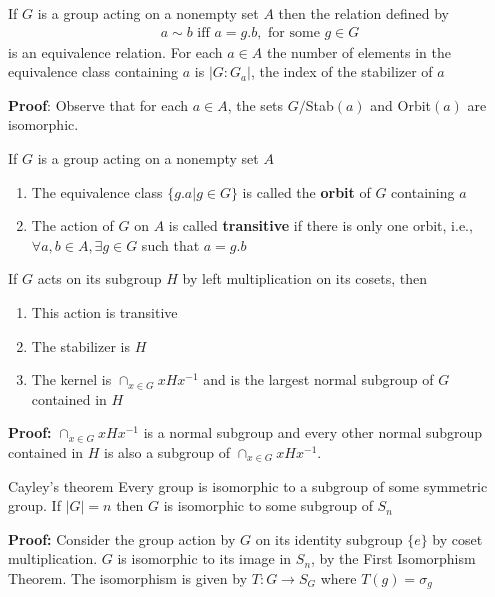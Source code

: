 \documentclass[titlepage, 12pt]{book}
\begin{document}
\begin{proposition}{}{}
    If $G$ is a group acting on a nonempty set $A$ then the relation defined by
    \begin{align*}
        a\sim b\textrm{ iff } a = g.b,\textrm{ for some } g\in G
    \end{align*}
    is an equivalence relation. For each $a\in A$ the number of elements in the
    equivalence class containing $a$ is $|G:G_a|$, the index of the stabilizer
    of $a$
\end{proposition}
\textbf{Proof}: Observe that for each $a\in A$, the sets $G/$Stab$(a)$ and
Orbit$(a)$ are isomorphic.

\begin{definition}{}{}
    If $G$ is a group acting on a nonempty set $A$
    \begin{enumerate}
        \item The equivalence class $\{g.a | g\in G\}$ is called the
            \textbf{orbit} of $G$ containing $a$
        \item The action of $G$ on $A$ is called \textbf{transitive} if there
            is only one orbit, i.e., $\forall a, b\in A, \exists g\in G$ such
            that $a = g.b$
    \end{enumerate}
\end{definition}

\begin{theorem}{}{}
    If $G$ acts on its subgroup $H$ by left multiplication on its cosets, then
    \begin{enumerate}
        \item This action is transitive
        \item The stabilizer is $H$
        \item The kernel is $\cap_{x\in G} xHx^{-1}$ and is the largest normal
            subgroup of $G$ contained in $H$
    \end{enumerate}
\end{theorem}
\textbf{Proof:} $\cap_{x\in G} xHx^{-1}$ is a normal subgroup and every other
normal subgroup contained in $H$ is also a subgroup of $\cap_{x\in G} xHx^{-1}$.

\begin{theorem}{Cayley's theorem}{}
    Every group is isomorphic to a subgroup of some symmetric group. If $|G| =
    n$ then $G$ is isomorphic to some subgroup of $S_n$
\end{theorem}
\textbf{Proof:} Consider the group action by $G$ on its identity subgroup $\{e\}$
by coset multiplication. $G$ is isomorphic to its image in $S_n$, by the First
Isomorphism Theorem. The isomorphism is given by $T:G\rightarrow S_G$ where
$T(g) = \sigma_g$
\end{document}
